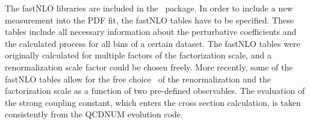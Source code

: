 \begin{description}
\begin{itemize}
The fastNLO libraries are included in the \fitter\ package.
In order to include a new measurement into the PDF fit,
the fastNLO tables have to be specified. These tables include all
necessary information about the perturbative coefficients and the
calculated process for all bins of a certain dataset. 
%
The fastNLO tables were originally calculated
for multiple factors of the factorization scale, 
and a renormalization scale factor could be chosen freely.
More recently, some of the fastNLO tables allow for 
the free choice~\cite{Britzger:2012bs} of the renormalization and the factorization
scale as a function of two pre-defined observables.
The evaluation of the strong coupling constant, which enters
the cross section calculation, is taken consistently from the 
QCDNUM evolution code.
\end{itemize}

\end{description}


